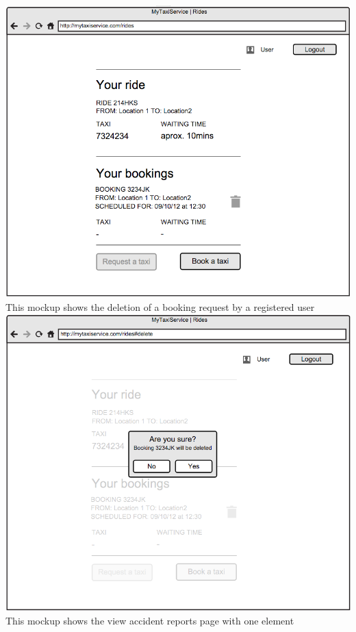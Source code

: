 \documentclass[11pt,titlepage]{article} %
\begin{document}
        \includegraphics[scale=0.52]{viewReqBookPage.png}\newline
        \newpage
        \noindent
        This mockup shows the deletion of a booking request by a registered user\newline
        \newline
        \includegraphics[scale=0.52]{deleteBookInt.png}\newline
        \newline
        \newpage
        This mockup shows the view accident reports page with one element\newline
\end{document}
